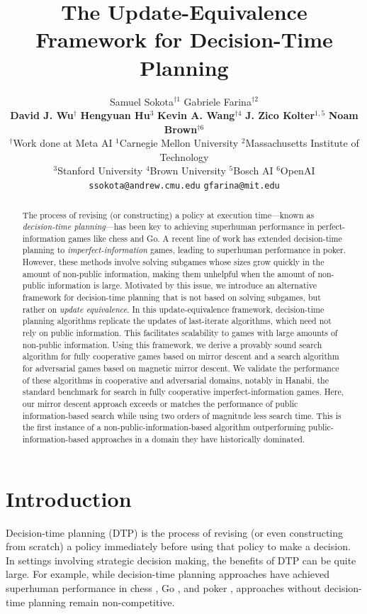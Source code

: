 \documentclass{article} %
\title{The Update-Equivalence Framework for Decision-Time Planning}
\author{Samuel Sokota$^{\dag 1}$ \quad Gabriele Farina$^{\dag 2}$ \\  \textbf{David J. Wu}$^{\dag}$ \quad \textbf{Hengyuan Hu}$^{3}$ \quad \textbf{Kevin A. Wang}$^{\dag 4}$ \quad \textbf{J. Zico Kolter}$^{1,5}$ \quad \textbf{Noam Brown}$^{ \dag 6}$\\
$^{\dag}$Work done at Meta AI \enspace $^1$Carnegie Mellon University \enspace $^2$Massachusetts Institute of Technology\\ $^3$Stanford University \enspace $^4$Brown University \enspace $^5$Bosch AI \enspace $^6$OpenAI\\
\texttt{ssokota@andrew.cmu.edu} \enspace \texttt{gfarina@mit.edu}
}
\theoremstyle{plain}
\theoremstyle{definition}
\theoremstyle{remark}
\begin{document}
\maketitle

\begin{abstract}
The process of revising (or constructing) a policy at execution time---known as \textit{decision-time planning}---has been key to achieving superhuman performance in perfect-information games like chess and Go.
A recent line of work has extended decision-time planning to \emph{imperfect-information} games, leading to superhuman performance in poker.
However, these methods involve solving subgames whose sizes grow quickly in the amount of non-public information, making them unhelpful when the amount of non-public information is large.
Motivated by this issue, we introduce an alternative framework for decision-time planning that is not based on solving subgames, but rather on \emph{update equivalence}.
In this update-equivalence framework, decision-time planning algorithms replicate the updates of last-iterate algorithms, which need not rely on public information. This facilitates scalability to games with large amounts of non-public information.
Using this framework, we derive a provably sound search algorithm for fully cooperative games based on mirror descent and a search algorithm for adversarial games based on magnetic mirror descent.
We validate the performance of these algorithms in cooperative and adversarial domains, notably in Hanabi, the standard benchmark for search in fully cooperative imperfect-information games.
Here, our mirror descent approach exceeds or matches the performance of public information-based search while using two orders of magnitude less search time.
This is the first instance of a non-public-information-based algorithm outperforming public-information-based approaches in a domain they have historically dominated.
\end{abstract}

\section{Introduction}

Decision-time planning (DTP) is the process of revising (or even constructing from scratch) a policy immediately before using that policy to make a decision.
In settings involving strategic decision making, the benefits of DTP can be quite large.
For example, while decision-time planning approaches have achieved superhuman performance in chess \citep{CAMPBELL200257}, Go \citep{SilverHuangEtAl16nature}, and poker \citep{deepstack,Brown2018SuperhumanAF,pluribus}, approaches without decision-time planning remain non-competitive.
\end{document}
